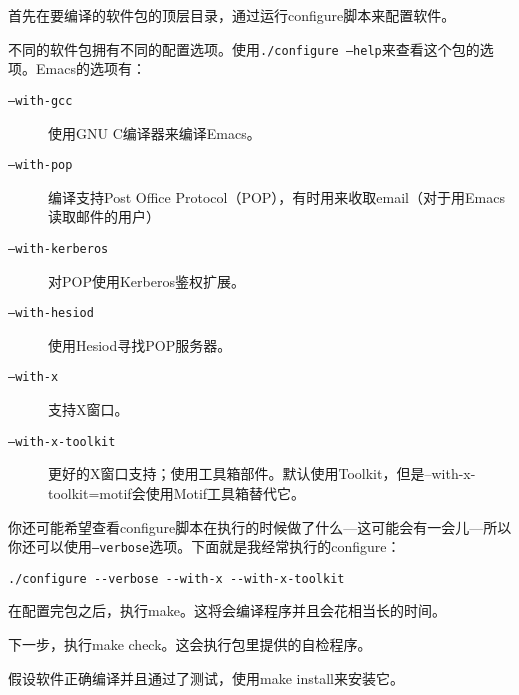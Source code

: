 首先在要编译的软件包的顶层目录，通过运行configure脚本来配置软件。

不同的软件包拥有不同的配置选项。使用\texttt{./configure --help}来查看这个包的选项。Emacs的选项有：

\begin{description}
  \item[\texttt{--with-gcc}] 使用GNU C编译器来编译Emacs。
  \item[\texttt{--with-pop}] 编译支持Post Office Protocol（POP），有时用来收取email（对于用Emacs读取邮件的用户）
  \item[\texttt{--with-kerberos}] 对POP使用Kerberos鉴权扩展。
  \item[\texttt{--with-hesiod}] 使用Hesiod寻找POP服务器。
  \item[\texttt{--with-x}] 支持X窗口。
  \item[\texttt{--with-x-toolkit}] 更好的X窗口支持；使用工具箱部件。默认使用Toolkit，但是--with-x-toolkit=motif会使用Motif工具箱替代它。
\end{description}

你还可能希望查看configure脚本在执行的时候做了什么---这可能会有一会儿---所以你还可以使用\texttt{--verbose}选项。下面就是我经常执行的configure：

\begin{verbatim}
./configure --verbose --with-x --with-x-toolkit
\end{verbatim}

在配置完包之后，执行make。这将会编译程序并且会花相当长的时间。

下一步，执行make check。这会执行包里提供的自检程序。

假设软件正确编译并且通过了测试，使用make install来安装它。
